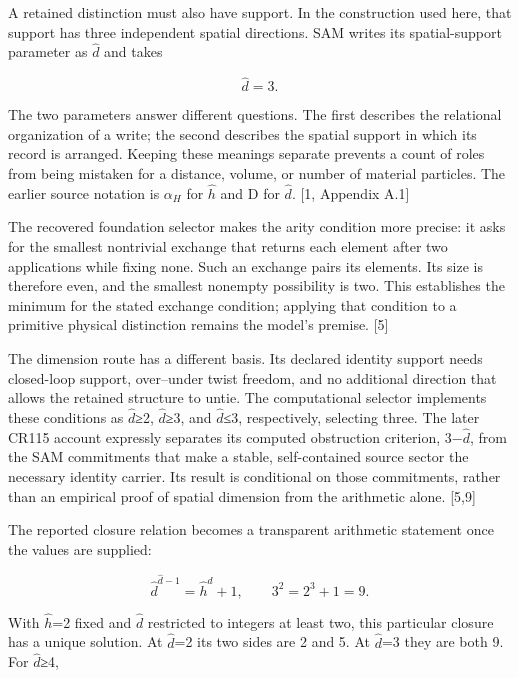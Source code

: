 \documentclass[10pt,twocolumn,letterpaper]{article}
\begin{document}
A retained distinction must also have support. In the construction used here, that support has three independent spatial directions. SAM writes its spatial-support parameter as \(\hat d\) and takes

\begin{equation}
\hat d=3.
\end{equation}

The two parameters answer different questions. The first describes the relational organization of a write; the second describes the spatial support in which its record is arranged. Keeping these meanings separate prevents a count of roles from being mistaken for a distance, volume, or number of material particles. The earlier source notation is \(\alpha_H\) for \(\hat h\) and D for \(\hat d\). {[}1, Appendix A.1{]}

The recovered foundation selector makes the arity condition more precise: it asks for the smallest nontrivial exchange that returns each element after two applications while fixing none. Such an exchange pairs its elements. Its size is therefore even, and the smallest nonempty possibility is two. This establishes the minimum for the stated exchange condition; applying that condition to a primitive physical distinction remains the model's premise. {[}5{]}

The dimension route has a different basis. Its declared identity support needs closed-loop support, over--under twist freedom, and no additional direction that allows the retained structure to untie. The computational selector implements these conditions as \(\hat d\)≥2, \(\hat d\)≥3, and \(\hat d\)≤3, respectively, selecting three. The later CR115 account expressly separates its computed obstruction criterion, 3−\(\hat d\), from the SAM commitments that make a stable, self-contained source sector the necessary identity carrier. Its result is conditional on those commitments, rather than an empirical proof of spatial dimension from the arithmetic alone. {[}5,9{]}

The reported closure relation becomes a transparent arithmetic statement once the values are supplied:

\begin{equation}
\hat d^{\hat d-1}=\hat h^{\hat d}+1,
\qquad 3^2=2^3+1=9.
\end{equation}

With \(\hat h\)=2 fixed and \(\hat d\) restricted to integers at least two, this particular closure has a unique solution. At \(\hat d\)=2 its two sides are 2 and 5. At \(\hat d\)=3 they are both 9. For \(\hat d\)≥4,
\end{document}
